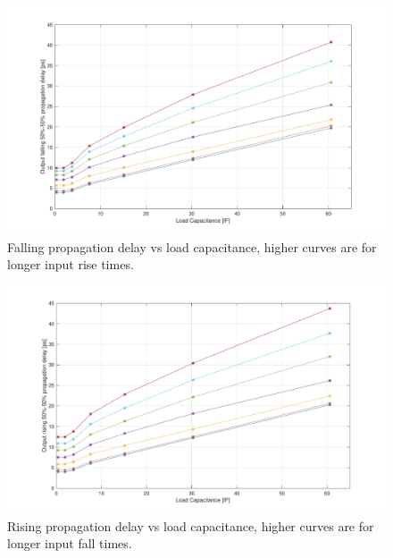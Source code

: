 \documentclass[a4paper]{article}
\begin{document}
\begin{figure}[H]
	\centering
	\includegraphics[width=\linewidth]{../INV_X4/simulations/tp_L.pdf}
	\caption{Falling propagation delay vs load capacitance, higher curves are for longer input rise times.}
	\label{fig:inv_tp_L}
\end{figure}
\begin{figure}[H]
	\centering
	\includegraphics[width=\linewidth]{../INV_X4/simulations/tp_H.pdf}
	\caption{Rising propagation delay vs load capacitance, higher curves are for longer input fall times.}
	\label{fig:inv_tp_H}
\end{figure}
\end{document}

